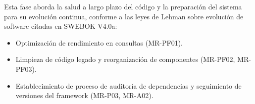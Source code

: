 Esta fase aborda la salud a largo plazo del código y la preparación del sistema
para su evolución continua, conforme a las leyes de Lehman sobre evolución de
software citadas en SWEBOK V4.0a:

\begin{itemize}
    \item Optimización de rendimiento en consultas (MR-PF01).
    \item Limpieza de código legado y reorganización de componentes (MR-PF02, MR-PF03).
    \item Establecimiento de proceso de auditoría de dependencias y seguimiento de
          versiones del framework (MR-P03, MR-A02).
\end{itemize}
